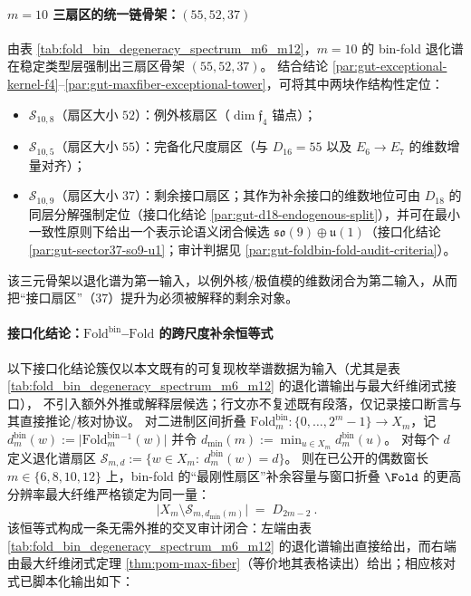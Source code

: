 \paragraph{\(m=10\) 三扇区的统一链骨架：\texorpdfstring{$(55,52,37)$}{(55,52,37)}}\label{par:gut-trisector-55-52-37}
由表 \ref{tab:fold_bin_degeneracy_spectrum_m6_m12}，\(m=10\) 的 bin-fold 退化谱在稳定类型层强制出三扇区骨架 \((55,52,37)\)。
结合结论 \ref{par:gut-exceptional-kernel-f4}--\ref{par:gut-maxfiber-exceptional-tower}，可将其中两块作结构性定位：
\begin{itemize}
  \item \(\mathcal{S}_{10,8}\)（扇区大小 \(52\)）：例外核扇区（\(\dim\mathfrak{f}_4\) 锚点）；
  \item \(\mathcal{S}_{10,5}\)（扇区大小 \(55\)）：完备化尺度扇区（与 \(D_{16}=55\) 以及 \(E_6\to E_7\) 的维数增量对齐）；
  \item \(\mathcal{S}_{10,9}\)（扇区大小 \(37\)）：剩余接口扇区；其作为补余接口的维数地位可由 \(D_{18}\) 的同层分解强制定位（接口化结论 \ref{par:gut-d18-endogenous-split}），并可在最小一致性原则下给出一个表示论语义闭合候选 \(\mathfrak{so}(9)\oplus\mathfrak{u}(1)\)（接口化结论 \ref{par:gut-sector37-so9-u1}；审计判据见 \ref{par:gut-foldbin-fold-audit-criteria}）。
\end{itemize}
该三元骨架以退化谱为第一输入，以例外核/极值模的维数闭合为第二输入，从而把“接口扇区”（\(37\)）提升为必须被解释的剩余对象。

\paragraph{接口化结论：\texorpdfstring{$\mathrm{Fold}^{\mathrm{bin}}$}{Foldbin}–\texorpdfstring{$\mathrm{Fold}$}{Fold} 的跨尺度补余恒等式}\label{par:gut-foldbin-fold-complement-identity}
以下接口化结论簇仅以本文既有的可复现枚举谱数据为输入（尤其是表 \ref{tab:fold_bin_degeneracy_spectrum_m6_m12} 的退化谱输出与最大纤维闭式接口），
不引入额外外推或解释层候选；行文亦不复述既有段落，仅记录接口断言与其直接推论/核对协议。
对二进制区间折叠 \(\mathrm{Fold}^{\mathrm{bin}}_m:\{0,\dots,2^m-1\}\to X_m\)，记
\(
d^{\mathrm{bin}}_m(w):=\bigl|\mathrm{Fold}^{\mathrm{bin}}_m{}^{-1}(w)\bigr|
\)
并令 \(d_{\min}(m):=\min_{u\in X_m}d^{\mathrm{bin}}_m(u)\)。
对每个 \(d\) 定义退化谱扇区
\(
\mathcal{S}_{m,d}:=\{w\in X_m:\ d^{\mathrm{bin}}_m(w)=d\}
\)。
则在已公开的偶数窗长 \(m\in\{6,8,10,12\}\) 上，bin-fold 的“最刚性扇区”补余容量与窗口折叠 \(\Fold\) 的更高分辨率最大纤维严格锁定为同一量：
\[
\boxed{\ \bigl|X_m\setminus \mathcal{S}_{m,d_{\min}(m)}\bigr|\;=\;D_{2m-2}\ }.
\]
该恒等式构成一条无需外推的交叉审计闭合：左端由表 \ref{tab:fold_bin_degeneracy_spectrum_m6_m12} 的退化谱输出直接给出，而右端由最大纤维闭式定理 \ref{thm:pom-max-fiber}（等价地其表格读出）给出；相应核对式已脚本化输出如下：


